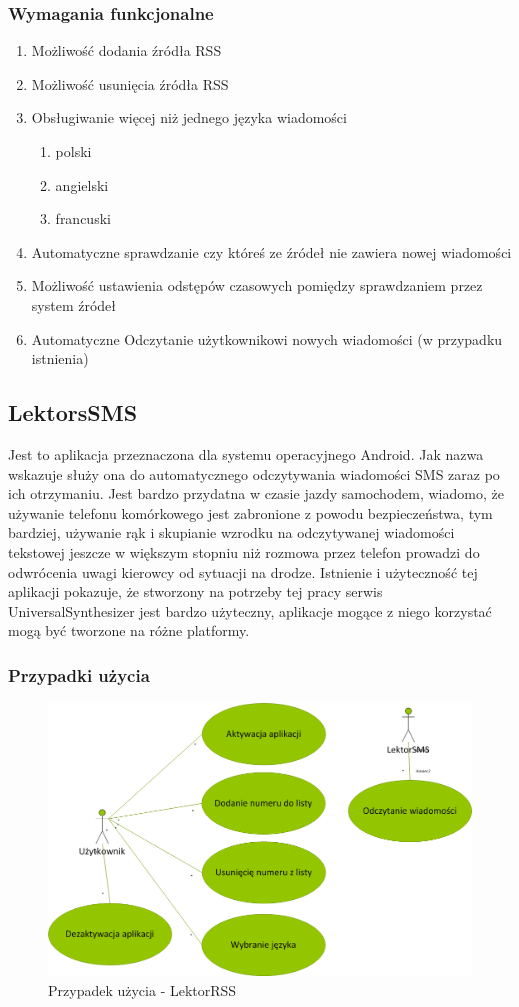 \subsubsection{Wymagania funkcjonalne}
\begin{enumerate}
	\item Możliwość dodania źródła RSS
	\item Możliwość usunięcia źródła RSS
	\item Obsługiwanie więcej niż jednego języka wiadomości
		\begin{enumerate}
			\item polski
			\item angielski
			\item francuski
		\end{enumerate}
	\item Automatyczne sprawdzanie czy któreś ze źródeł nie zawiera nowej wiadomości
	\item Możliwość ustawienia odstępów czasowych pomiędzy sprawdzaniem przez system źródeł
	\item Automatyczne Odczytanie użytkownikowi nowych wiadomości (w przypadku istnienia) 
\end{enumerate}  
\subsection{LektorsSMS}
Jest to aplikacja przeznaczona dla systemu operacyjnego Android. Jak nazwa wskazuje służy ona do automatycznego odczytywania wiadomości SMS zaraz po ich otrzymaniu. Jest bardzo przydatna w czasie jazdy samochodem, wiadomo, że używanie telefonu komórkowego jest zabronione z powodu bezpieczeństwa, tym bardziej, używanie rąk i skupianie wzrodku na odczytywanej wiadomości tekstowej jeszcze w większym stopniu niż rozmowa przez telefon prowadzi do odwrócenia uwagi kierowcy od sytuacji na drodze. Istnienie i użyteczność tej aplikacji pokazuje, że stworzony na potrzeby tej pracy serwis UniversalSynthesizer jest bardzo użyteczny, aplikacje mogące z niego korzystać mogą być tworzone na różne platformy.
\newpage
\subsubsection{Przypadki użycia}
\begin{figure}[!h]
	\centering
	\includegraphics[scale=0.45]{useCaseLektorSMS.png} 
	\caption{Przypadek użycia - LektorRSS}
\end{figure}

